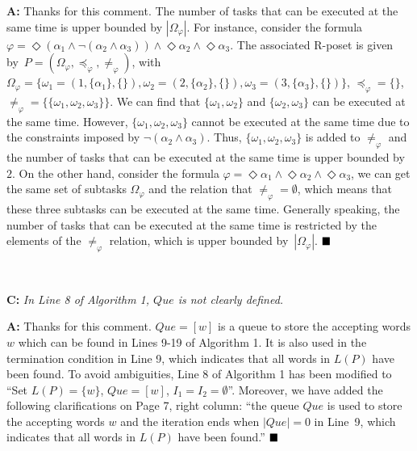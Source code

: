 \documentclass[10pt]{article}
\begin{document}
\textbf{A:}
Thanks for this comment.
The number of tasks that can be executed at the same time is upper bounded by $|\Omega_\varphi|$.
For instance, consider the formula $\varphi=\Diamond (\alpha_1 \land \neg (\alpha_2 \land \alpha_3) )\land \Diamond \alpha_2 \land \Diamond \alpha_3$.
The associated R-poset is given by~$P=(\Omega_\varphi, \preceq_\varphi, \neq_\varphi)$,
 with $\Omega_\varphi=\{\omega_1=(1,\{\alpha_1\},\{\}),
 \omega_2=(2,\{\alpha_2\},\{\}),
 \omega_3=(3,\{\alpha_3\},\{\})
 \}$, $\preceq_\varphi=\{\}$, $\neq_\varphi=\{\{\omega_1,\omega_2,\omega_3\}\}$.
We can find that $\{\omega_1, \omega_2\}$  and $\{\omega_2, \omega_3\}$ can be executed at the same time.
However, $\{\omega_1,\omega_2,\omega_3\}$ cannot be executed at the same time due to the constraints imposed by $\neg (\alpha_2\land\alpha_3)$.
Thus, $\{\omega_1,\omega_2,\omega_3\}$ is added to $\neq_\varphi$ and
the number of tasks that can be executed at the same time is upper bounded by~$2$. On the other hand,
consider the formula $\varphi=\Diamond \alpha_1 \land \Diamond \alpha_2 \land \Diamond \alpha_3$, we can get the same set of subtasks $\Omega_{\varphi}$
and the relation that $\neq_\varphi=\emptyset$, which means that these three subtasks can be executed at
the same time. Generally speaking, the number of tasks that can be executed
at the same time is restricted by the elements of the $\neq_\varphi$ relation,
which is upper bounded by~$|\Omega_{\varphi}|$.
$\hfill\blacksquare$

\hspace*{\fill} \


\textbf{C:}
\emph{In Line 8 of Algorithm 1, $Que$ is not clearly defined.
}

\textbf{A:} Thanks for this comment.
$Que=[w]$ is a queue to store the accepting words $w$
which can be found in Lines 9-19 of Algorithm 1.
It is also used in the termination condition in Line 9,
which indicates that all words in $L(P)$ have been found.
To avoid ambiguities, Line 8 of Algorithm 1 has been modified to
``Set $L(P)=\{w\}$, $Que=[w]$, $I_1=I_2=\emptyset$''.
Moreover, we have added the following clarifications on Page 7, right column:
``the queue $Que$ is used to store the accepting words $w$
and the iteration ends when $|Que|=0$ in Line~9,
which indicates that all words in $L(P)$ have been found.''
$\hfill\blacksquare$


\hspace*{\fill} \
\end{document}
